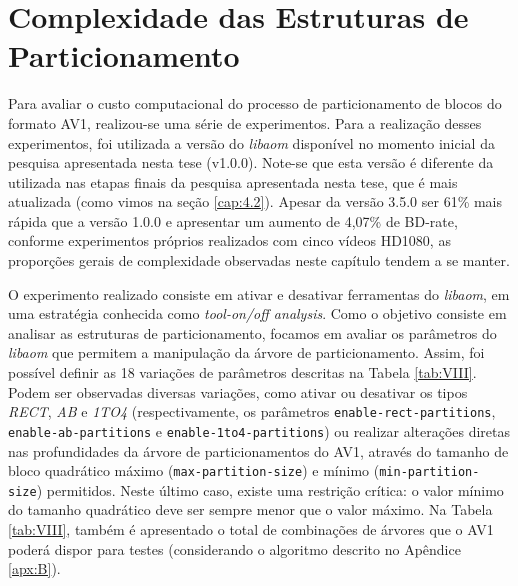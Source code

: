 \section{Complexidade das Estruturas de Particionamento}
\label{cap:5.1}

Para avaliar o custo computacional do processo de particionamento de blocos do formato AV1, realizou-se uma série de experimentos. Para a realização desses experimentos, foi utilizada a versão do \textit{libaom} disponível no momento inicial da pesquisa apresentada nesta tese (v1.0.0). Note-se que esta versão é diferente da utilizada nas etapas finais da pesquisa apresentada nesta tese, que é mais atualizada (como vimos na seção \ref{cap:4.2}). Apesar da versão 3.5.0 ser 61\% mais rápida que a versão 1.0.0 e apresentar um aumento de 4,07\% de BD-rate, conforme experimentos próprios realizados com cinco vídeos HD1080, as proporções gerais de complexidade observadas neste capítulo tendem a se manter.

O experimento realizado consiste em ativar e desativar ferramentas do \textit{libaom}, em uma estratégia conhecida como \textit{tool-on/off analysis}. Como o objetivo consiste em analisar as estruturas de particionamento, focamos em avaliar os parâmetros do \textit{libaom} que permitem a manipulação da árvore de particionamento. Assim, foi possível definir as 18 variações de parâmetros descritas na Tabela \ref{tab:VIII}. Podem ser observadas diversas variações, como ativar ou desativar os tipos \textit{RECT}, \textit{AB} e \textit{1TO4} (respectivamente, os parâmetros \texttt{enable-rect-partitions}, \texttt{enable-ab-partitions} e \texttt{enable-1to4-partitions}) ou realizar alterações diretas nas profundidades da árvore de particionamentos do AV1, através do tamanho de bloco quadrático máximo (\texttt{max-partition-size}) e mínimo (\texttt{min-partition-size}) permitidos. Neste último caso, existe uma restrição crítica: o valor mínimo do tamanho quadrático deve ser sempre menor que o valor máximo. Na Tabela \ref{tab:VIII}, também é apresentado o total de combinações de árvores que o AV1 poderá dispor para testes (considerando o algoritmo descrito no Apêndice \ref{apx:B}).



